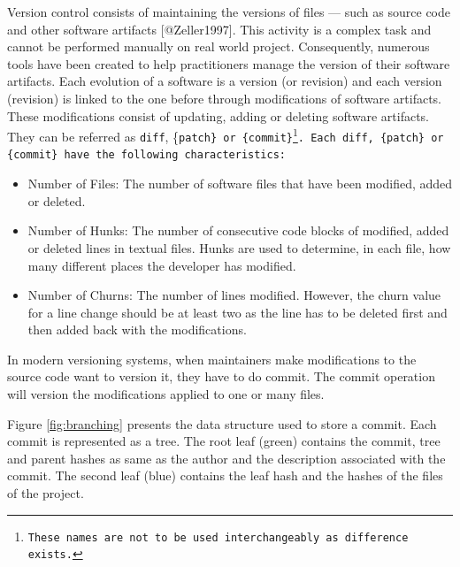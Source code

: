 Version control consists of maintaining the versions of files --- such
as source code and other software artifacts {[}@Zeller1997{]}. This
activity is a complex task and cannot be performed manually on real
world project. Consequently, numerous tools have been created to help
practitioners manage the version of their software artifacts. Each
evolution of a software is a version (or revision) and each version
(revision) is linked to the one before through modifications of software
artifacts. These modifications consist of updating, adding or deleting
software artifacts. They can be referred as \texttt{diff}, \{\tt patch\}
or
\{\tt commit\}\footnote{These names are not to be used interchangeably as difference exists.}.
Each \texttt{diff}, \{\tt patch\} or \{\tt commit\} have the following
characteristics:

\begin{itemize}
\tightlist
\item
  Number of Files: The number of software files that have been modified,
  added or deleted.
\item
  Number of Hunks: The number of consecutive code blocks of modified,
  added or deleted lines in textual files. Hunks are used to determine,
  in each file, how many different places the developer has modified.
\item
  Number of Churns: The number of lines modified. However, the churn
  value for a line change should be at least two as the line has to be
  deleted first and then added back with the modifications.
\end{itemize}

In modern versioning systems, when maintainers make modifications to the
source code want to version it, they have to do commit. The commit
operation will version the modifications applied to one or many files.

Figure \ref{fig:branching} presents the data structure used to store a
commit. Each commit is represented as a tree. The root leaf (green)
contains the commit, tree and parent hashes as same as the author and
the description associated with the commit. The second leaf (blue)
contains the leaf hash and the hashes of the files of the project.

